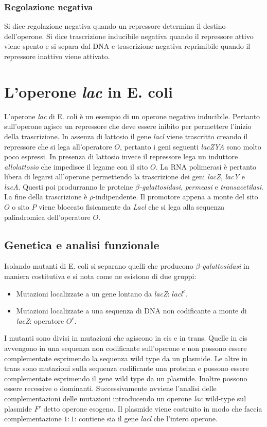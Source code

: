 \subsubsection{Regolazione negativa}
Si dice regolazione negativa quando un repressore determina il destino dell'operone. Si dice trascrizione inducibile negativa quando il repressore attivo viene spento e si separa dal
DNA e trascrizione negativa reprimibile quando il repressore inattivo viene attivato. 
\section{L'operone \emph{lac} in E. coli}
L'operone \emph{lac} di E. coli \`e un esempio di un operone negativo inducibile. Pertanto sull'operone agisce un repressore che deve essere inibito per permettere l'inizio della 
trascrizione. In assenza di lattosio il gene \emph{lacl} viene trascritto creando il repressore che si lega all'operatore $O$, pertanto i geni seguenti \emph{lacZYA} sono molto poco 
espressi. In presenza di lattosio invece il repressore lega un induttore \emph{allolattosio} che impedisce il legame con il sito $O$. La RNA polimerasi \`e pertanto libera di legarsi 
all'operone permettendo la trascrizione dei geni \emph{lacZ}, \emph{lacY} e \emph{lacA}. Questi poi produrranno le proteine \emph{$\beta$-galattosidasi}, \emph{permeasi} e 
\emph{transacetilasi}. La fine della trascrizione \`e $\rho$-indipendente. Il promotore appena a monte del sito $O$ o sito $P$ viene bloccato fisicamente da \emph{Lacl} che si lega alla
sequenza palindromica dell'operatore $O$. 
\subsection{Genetica e analisi funzionale}
Isolando mutanti di E. coli si separano quelli che producono \emph{$\beta$-galattosidasi} in maniera costitutiva e si nota come ne esistono di due gruppi:
\begin{itemize}
	\item Mutazioni localizzate a un gene lontano da \emph{lacZ}: \emph{$lacl^c$}. 
	\item Mutazioni localizzate a una sequenza di DNA non codificante a monte di \emph{lacZ}: operatore $O^c$.
\end{itemize}
I mutanti sono divisi in mutazioni che agiscono in cis e in trans. Quelle in cis avvengono in una sequenza non codificante sull'operone e non possono essere complementate esprimendo la
sequenza wild type da un plasmide. Le altre in trans sono mutazioni sulla sequenza codificante una proteina e possono essere complementate esprimendo il gene wild type da un plasmide. 
Inoltre possono essere recessive o dominanti. Successivamente avviene l'analisi delle complementazioni delle mutazioni introducendo un operone \emph{lac} wild-type sul plasmide 
$F'$ detto operone esogeno. Il plasmide viene costruito in modo che faccia complementazione $1:1$: contiene sia il gene \emph{lacl} che l'intero operone. 
